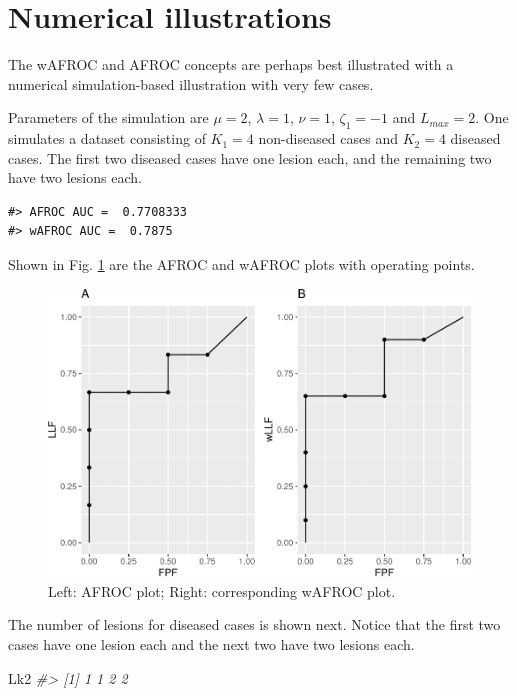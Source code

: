 \documentclass[
]{book}
\newenvironment{Shaded}{\begin{snugshade}}{\end{snugshade}}
\newcommand{\CommentTok}[1]{\textcolor[rgb]{0.56,0.35,0.01}{\textit{#1}}}
\newcommand{\NormalTok}[1]{#1}
\begin{document}
\hypertarget{froc-meanings-numerical-illustrations}{%
\section{Numerical illustrations}\label{froc-meanings-numerical-illustrations}}

The wAFROC and AFROC concepts are perhaps best illustrated with a numerical simulation-based illustration with very few cases.

Parameters of the simulation are \(\mu = 2\), \(\lambda = 1\), \(\nu = 1\), \(\zeta_1 = -1\) and \(L_{max} = 2\). One simulates a dataset consisting of \(K_1 = 4\) non-diseased cases and \(K_2 = 4\) diseased cases. The first two diseased cases have one lesion each, and the remaining two have two lesions each.

\begin{verbatim}
#> AFROC AUC =  0.7708333
#> wAFROC AUC =  0.7875
\end{verbatim}

Shown in Fig. \ref{fig:plots-p1-p2} are the AFROC and wAFROC plots with operating points.

\begin{figure}
\centering
\includegraphics{14-froc-meanings-foms-ocs_files/figure-latex/plots-p1-p2-1.pdf}
\caption{\label{fig:plots-p1-p2}Left: AFROC plot; Right: corresponding wAFROC plot.}
\end{figure}

The number of lesions for diseased cases is shown next. Notice that the first two cases have one lesion each and the next two have two lesions each.

\begin{Shaded}
\begin{Highlighting}[]
\NormalTok{Lk2}
\CommentTok{#> [1] 1 1 2 2}
\end{Highlighting}
\end{Shaded}
\end{document}

